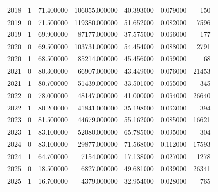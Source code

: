 \begin{tabular}{rrrrrrr}
2018 & 1 & 71.400000 & 106055.000000 & 40.393000 & 0.079000 & 150 \\
2019 & 0 & 71.500000 & 119380.000000 & 51.652000 & 0.082000 & 7596 \\
2019 & 1 & 69.900000 & 87177.000000 & 37.575000 & 0.066000 & 177 \\
2020 & 0 & 69.500000 & 103731.000000 & 54.454000 & 0.088000 & 2791 \\
2020 & 1 & 68.500000 & 85214.000000 & 45.456000 & 0.069000 & 68 \\
2021 & 0 & 80.300000 & 66907.000000 & 43.449000 & 0.076000 & 21453 \\
2021 & 1 & 80.700000 & 51439.000000 & 33.501000 & 0.065000 & 345 \\
2022 & 0 & 78.000000 & 48147.000000 & 41.000000 & 0.064000 & 26640 \\
2022 & 1 & 80.200000 & 41841.000000 & 35.198000 & 0.063000 & 394 \\
2023 & 0 & 81.500000 & 44679.000000 & 55.162000 & 0.085000 & 16621 \\
2023 & 1 & 83.100000 & 52080.000000 & 65.785000 & 0.095000 & 304 \\
2024 & 0 & 83.100000 & 29877.000000 & 71.568000 & 0.112000 & 17593 \\
2024 & 1 & 64.700000 & 7154.000000 & 17.138000 & 0.027000 & 1278 \\
2025 & 0 & 18.500000 & 6827.000000 & 49.681000 & 0.039000 & 26341 \\
2025 & 1 & 16.700000 & 4379.000000 & 32.954000 & 0.028000 & 765 \\
\bottomrule
\end{tabular}
